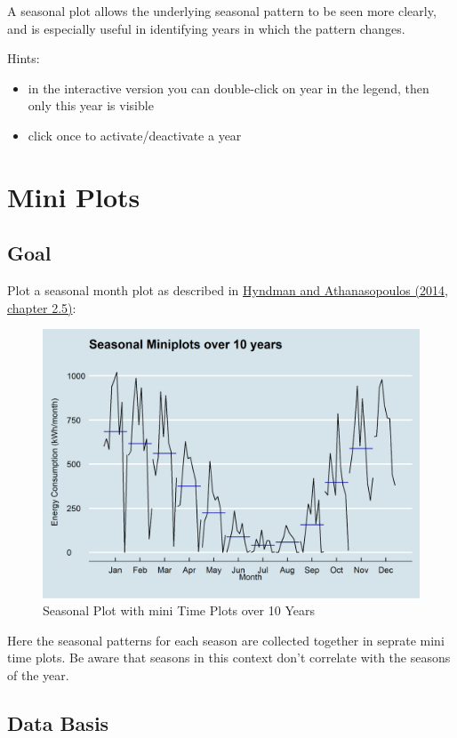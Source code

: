 \documentclass[
]{book}
\begin{document}
A seasonal plot allows the underlying seasonal pattern to be seen more clearly, and is especially useful in identifying years in which the pattern changes.

Hints:

\begin{itemize}
\item
  in the interactive version you can double-click on year in the legend, then only this year is visible
\item
  click once to activate/deactivate a year
\end{itemize}

\hypertarget{mini-plots}{%
\section{Mini Plots}\label{mini-plots}}

\hypertarget{goal-1}{%
\subsection{Goal}\label{goal-1}}

Plot a seasonal month plot as described in \href{https://otexts.com/fpp2/seasonal-subseries-plots.html}{Hyndman and Athanasopoulos (2014, chapter 2.5)}:

\begin{figure}
\includegraphics[width=0.7\linewidth]{images/plotSeasonalMiniplots} \caption{Seasonal Plot with mini Time Plots over 10 Years}\label{fig:unnamed-chunk-10}
\end{figure}

Here the seasonal patterns for each season are collected together in seprate mini time plots. Be aware that seasons in this context don't correlate with the seasons of the year.

\hypertarget{data-basis-1}{%
\subsection{Data Basis}\label{data-basis-1}}
\end{document}
